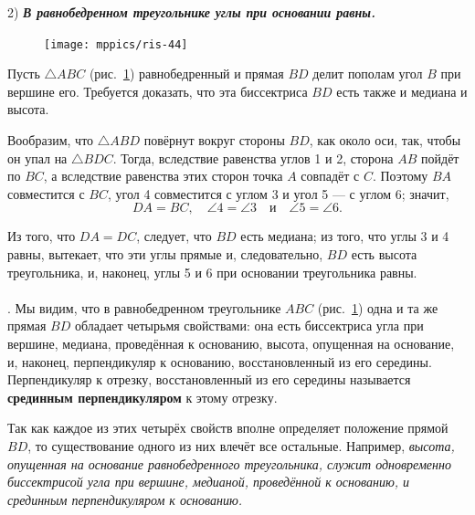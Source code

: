 2) \textbf{\emph{В равнобедренном треугольнике углы при основании равны.}}

\begin{figure}
\centering
\texttt{[image: mppics/ris-44]}
\caption{}\label{1938/ris-44}
\end{figure}


Пусть $\triangle ABC$ (рис.~\ref{1938/ris-44}) равнобедренный и прямая $BD$ делит пополам угол $B$ при вершине его.
Требуется доказать, что эта биссектриса $BD$ есть также и медиана и высота.

Вообразим, что $\triangle ABD$ повёрнут вокруг стороны $BD$, как около оси, так, чтобы он упал на $\triangle BDC$.
Тогда, вследствие равенства углов 1 и 2, сторона $AB$ пойдёт по $BC$, а вследствие равенства этих сторон точка $A$ совпадёт с $C$.
Поэтому $BA$ совместится с $BC$, угол 4 совместится с углом 3 и угол 5 — с углом 6;
значит,
\[DA = BC,\quad \angle 4 = \angle 3\quad \text{и}\quad \angle 5 = \angle 6.\]

Из того, что $DA=DC$, следует, что $BD$ есть медиана;
из того, что углы 3 и 4 равны, вытекает, что эти углы прямые и, следовательно, $BD$ есть высота треугольника, и, наконец, углы 5 и 6 при основании треугольника равны.

\paragraph{}\label{1938/39}
\mbox{.}
Мы видим, что в равнобедренном треугольнике $ABC$ (рис.~\ref{1938/ris-44}) одна и та же прямая $BD$ обладает четырьмя свойствами:
она есть биссектриса угла при вершине, медиана, проведённая к основанию, высота, опущенная на основание, и, наконец, перпендикуляр к основанию, восстановленный из его середины. 
Перпендикуляр к отрезку, восстановленный из его середины называется \textbf{срединным перпендикуляром} к этому отрезку.

Так как каждое из этих четырёх свойств вполне определяет положение прямой $BD$, то существование одного из них влечёт все остальные.
Например, \emph{высота, опущенная на основание равнобедренного треугольника, служит одновременно биссектрисой угла при вершине, медианой, проведённой к основанию, и срединным перпендикуляром к основанию.} 

